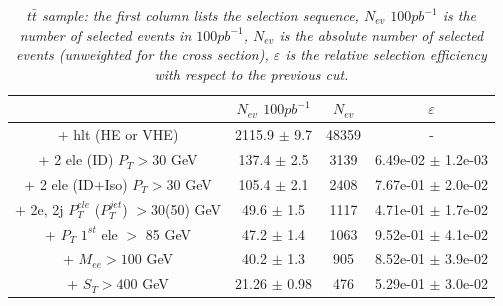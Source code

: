\begin{table}[htbp]
\begin{center}
\begin{tabular}{|c|c|c|c|}
\hline
\hline
 & $N_{ev}$ $100pb^{-1}$ & $N_{ev}$ & $\varepsilon$ \\
\hline
\hline

+ hlt (HE or VHE) &2115.9 $\pm$ 9.7 & 48359 & - \\
+ 2 ele (ID) $P_{T} >30$ GeV &137.4 $\pm$ 2.5& 3139 & 6.49e-02 $\pm$ 1.2e-03\\
+ 2 ele (ID+Iso) $P_{T} >30$ GeV &105.4 $\pm$ 2.1 & 2408 & 7.67e-01 $\pm$ 2.0e-02\\
+ 2e, 2j $P_{T}^{ele}$ ($P_{T}^{jet}$) $>$30(50) GeV &49.6 $\pm$ 1.5& 1117 & 4.71e-01 $\pm$ 1.7e-02\\
+ $P_{T}$ $1^{st}$ ele $>$ 85 GeV &47.2 $\pm$ 1.4& 1063 & 9.52e-01 $\pm$ 4.1e-02\\
+ $M_{ee} >100$ GeV&40.2 $\pm$ 1.3& 905 & 8.52e-01 $\pm$ 3.9e-02\\
+ $S_{T} >400$ GeV &21.26 $\pm$ 0.98 & 476 & 5.29e-01 $\pm$ 3.0e-02\\
\hline
\end{tabular}
\end{center}
\caption{\small \sl $t\bar{t}$ sample: the first column lists the selection sequence, $N_{ev}$ $100pb^{-1}$ is the number of selected events in $100pb^{-1}$, $N_{ev}$ is the absolute number of selected events (unweighted for the cross section), $\varepsilon$ is the relative selection efficiency with respect to the previous cut.}
\label{tab:selection_effic_ttbar}
\end{table}




